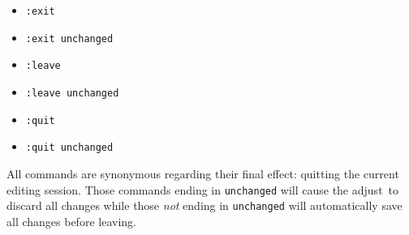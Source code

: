 \documentclass[11pt, a4paper, british]{scrartcl}
\DeclareRobustCommand{\adjust}{\textsf{adjust}}
\begin{document}
\begin{itemize}
\item \texttt{:exit}
\item \texttt{:exit unchanged}
\item \texttt{:leave}
\item \texttt{:leave unchanged}
\item \texttt{:quit}
\item \texttt{:quit unchanged}
\end{itemize}

All commands are synonymous regarding their final effect:  quitting the current
editing session.  Those commands ending in \texttt{unchanged} will cause the
\adjust\ to discard all changes while those \emph{not} ending in \texttt
{unchanged} will automatically save all changes before leaving.
\end{document}
